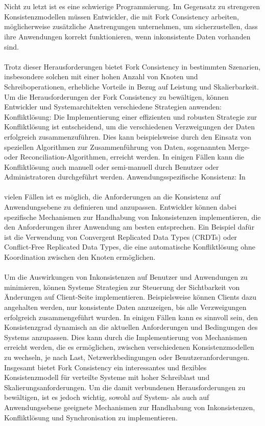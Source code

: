\documentclass[../vs-script-first-v01.tex]{subfiles}
\begin{document}
\\\\
Nicht zu letzt ist es eine schwierige Programmierung. Im Gegensatz zu strengeren Konsistenzmodellen müssen Entwickler, die mit Fork Consistency arbeiten, möglicherweise zusätzliche Anstrengungen unternehmen, um sicherzustellen, dass ihre Anwendungen korrekt funktionieren, wenn inkonsistente Daten vorhanden sind.
\\\\
Trotz dieser Herausforderungen bietet Fork Consistency in bestimmten Szenarien, insbesondere solchen mit einer hohen Anzahl von Knoten und Schreiboperationen, erhebliche Vorteile in Bezug auf Leistung und Skalierbarkeit. Um die Herausforderungen der Fork Consistency zu bewältigen, können Entwickler und Systemarchitekten verschiedene Strategien anwenden:
Konfliktlösung: Die Implementierung einer effizienten und robusten Strategie zur Konfliktlösung ist entscheidend, um die verschiedenen Verzweigungen der Daten erfolgreich zusammenzuführen. Dies kann beispielsweise durch den Einsatz von speziellen Algorithmen zur Zusammenführung von Daten, sogenannten Merge- oder Reconciliation-Algorithmen, erreicht werden. In einigen Fällen kann die Konfliktlösung auch manuell oder semi-manuell durch Benutzer oder Administratoren durchgeführt werden.
Anwendungsspezifische Konsistenz: In
\\\\
vielen Fällen ist es möglich, die Anforderungen an die Konsistenz auf Anwendungsebene zu definieren und anzupassen. Entwickler können dabei spezifische Mechanismen zur Handhabung von Inkonsistenzen implementieren, die den Anforderungen ihrer Anwendung am besten entsprechen. Ein Beispiel dafür ist die Verwendung von Convergent Replicated Data Types (CRDTs) oder Conflict-Free Replicated Data Types, die eine automatische Konfliktlösung ohne Koordination zwischen den Knoten ermöglichen.
\\\\
Um die Auswirkungen von Inkonsistenzen auf Benutzer und Anwendungen zu minimieren, können Systeme Strategien zur Steuerung der Sichtbarkeit von Änderungen auf Client-Seite implementieren. Beispielsweise können Clients dazu angehalten werden, nur konsistente Daten anzuzeigen, bis alle Verzweigungen erfolgreich zusammengeführt wurden. In einigen Fällen kann es sinnvoll sein, den Konsistenzgrad dynamisch an die aktuellen Anforderungen und Bedingungen des Systems anzupassen. Dies kann durch die Implementierung von Mechanismen erreicht werden, die es ermöglichen, zwischen verschiedenen Konsistenzmodellen zu wechseln, je nach Last, Netzwerkbedingungen oder Benutzeranforderungen.
Insgesamt bietet Fork Consistency ein interessantes und flexibles Konsistenzmodell für verteilte Systeme mit hoher Schreiblast und Skalierungsanforderungen. Um die damit verbundenen Herausforderungen zu bewältigen, ist es jedoch wichtig, sowohl auf System- als auch auf Anwendungsebene geeignete Mechanismen zur Handhabung von Inkonsistenzen, Konfliktlösung und Synchronisation zu implementieren.
\end{document}
